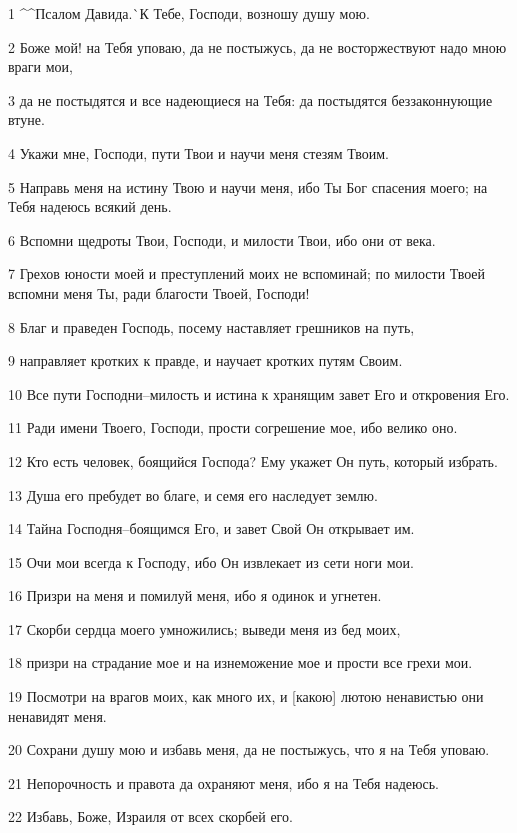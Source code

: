 \par 1 ^^Псалом Давида.^^ К Тебе, Господи, возношу душу мою.
\par 2 Боже мой! на Тебя уповаю, да не постыжусь, да не восторжествуют надо мною враги мои,
\par 3 да не постыдятся и все надеющиеся на Тебя: да постыдятся беззаконнующие втуне.
\par 4 Укажи мне, Господи, пути Твои и научи меня стезям Твоим.
\par 5 Направь меня на истину Твою и научи меня, ибо Ты Бог спасения моего; на Тебя надеюсь всякий день.
\par 6 Вспомни щедроты Твои, Господи, и милости Твои, ибо они от века.
\par 7 Грехов юности моей и преступлений моих не вспоминай; по милости Твоей вспомни меня Ты, ради благости Твоей, Господи!
\par 8 Благ и праведен Господь, посему наставляет грешников на путь,
\par 9 направляет кротких к правде, и научает кротких путям Своим.
\par 10 Все пути Господни--милость и истина к хранящим завет Его и откровения Его.
\par 11 Ради имени Твоего, Господи, прости согрешение мое, ибо велико оно.
\par 12 Кто есть человек, боящийся Господа? Ему укажет Он путь, который избрать.
\par 13 Душа его пребудет во благе, и семя его наследует землю.
\par 14 Тайна Господня--боящимся Его, и завет Свой Он открывает им.
\par 15 Очи мои всегда к Господу, ибо Он извлекает из сети ноги мои.
\par 16 Призри на меня и помилуй меня, ибо я одинок и угнетен.
\par 17 Скорби сердца моего умножились; выведи меня из бед моих,
\par 18 призри на страдание мое и на изнеможение мое и прости все грехи мои.
\par 19 Посмотри на врагов моих, как много их, и [какою] лютою ненавистью они ненавидят меня.
\par 20 Сохрани душу мою и избавь меня, да не постыжусь, что я на Тебя уповаю.
\par 21 Непорочность и правота да охраняют меня, ибо я на Тебя надеюсь.
\par 22 Избавь, Боже, Израиля от всех скорбей его.

